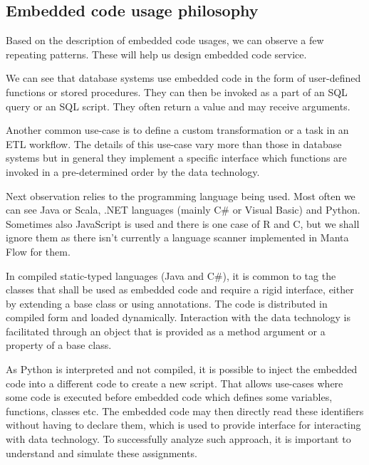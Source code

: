 \subsection{Embedded code usage philosophy}
Based on the description of embedded code usages, we can observe a few repeating patterns. These will help us design embedded code service.
\par
We can see that database systems use embedded code in the form of user-defined functions or stored procedures. They can then be invoked as a part of an SQL query or an SQL script. They often return a value and may receive arguments.
\par
Another common use-case is to define a custom transformation or a task in an ETL workflow. The details of this use-case vary more than those in database systems but in general they implement a specific interface which functions are invoked in a pre-determined order by the data technology.
\par
Next observation relies to the programming language being used. Most often we can see Java or Scala, .NET languages (mainly C\# or Visual Basic) and Python. Sometimes also JavaScript is used and there is one case of R and C, but we shall ignore them as there isn't currently a language scanner implemented in Manta Flow for them.
\par
In compiled static-typed languages (Java and C\#), it is common to tag the classes that shall be used as embedded code and require a rigid interface, either by extending a base class or using annotations. The code is distributed in compiled form and loaded dynamically. Interaction with the data technology is facilitated through an object that is provided as a method argument or a property of a base class.
\par
As Python is interpreted and not compiled, it is possible to inject the embedded code into a different code to create a new script. That allows use-cases where some code is executed before embedded code which defines some variables, functions, classes etc. The embedded code may then directly read these identifiers without having to declare them, which is used to provide interface for interacting with data technology. To successfully analyze such approach, it is important to understand and simulate these assignments.




